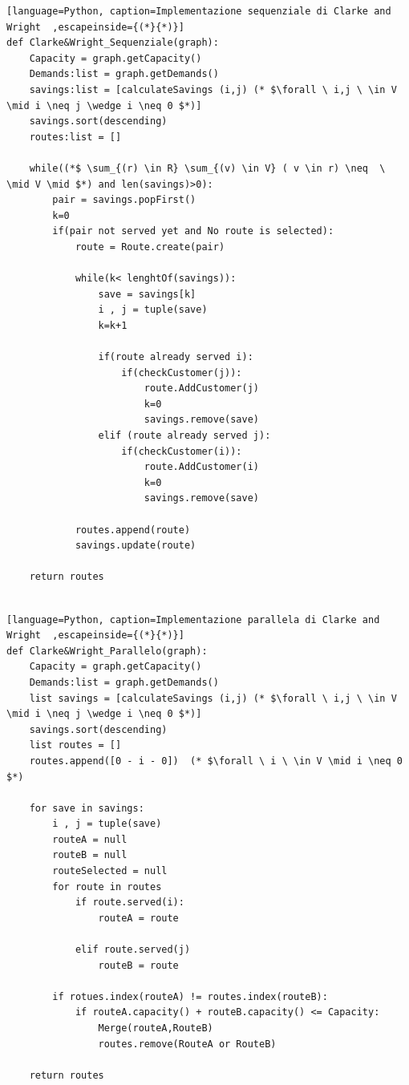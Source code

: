 \documentclass[]{article}
\begin{document}
\begin{lstlisting}[language=Python, caption=Implementazione sequenziale di Clarke and Wright  ,escapeinside={(*}{*)}]
def Clarke&Wright_Sequenziale(graph):
	Capacity = graph.getCapacity()
	Demands:list = graph.getDemands()
	savings:list = [calculateSavings (i,j) (* $\forall \ i,j \ \in V \mid i \neq j \wedge i \neq 0 $*)]
	savings.sort(descending)
	routes:list = []
	
	while((*$ \sum_{(r) \in R} \sum_{(v) \in V} ( v \in r) \neq  \ \mid V \mid $*) and len(savings)>0):
		pair = savings.popFirst()
		k=0
		if(pair not served yet and No route is selected):
			route = Route.create(pair)
			
			while(k< lenghtOf(savings)):
				save = savings[k]
				i , j = tuple(save)
				k=k+1
				
				if(route already served i):
					if(checkCustomer(j)):
						route.AddCustomer(j)
						k=0
						savings.remove(save)							
				elif (route already served j):
					if(checkCustomer(i)):
						route.AddCustomer(i)
						k=0
						savings.remove(save)				
					
			routes.append(route)
			savings.update(route)
					
	return routes	
				
\end{lstlisting}


\begin{lstlisting}[language=Python, caption=Implementazione parallela di Clarke and Wright  ,escapeinside={(*}{*)}]
def Clarke&Wright_Parallelo(graph):
	Capacity = graph.getCapacity()
	Demands:list = graph.getDemands()
	list savings = [calculateSavings (i,j) (* $\forall \ i,j \ \in V \mid i \neq j \wedge i \neq 0 $*)]
	savings.sort(descending)
	list routes = []
	routes.append([0 - i - 0])  (* $\forall \ i \ \in V \mid i \neq 0 $*) 
	
	for save in savings:
		i , j = tuple(save)
		routeA = null
		routeB = null
		routeSelected = null
		for route in routes
			if route.served(i):
				routeA = route

			elif route.served(j)
				routeB = route
					    
		if rotues.index(routeA) != routes.index(routeB):
			if routeA.capacity() + routeB.capacity() <= Capacity:
				Merge(routeA,RouteB) 
				routes.remove(RouteA or RouteB)
				
	return routes
\end{lstlisting}
\end{document}
